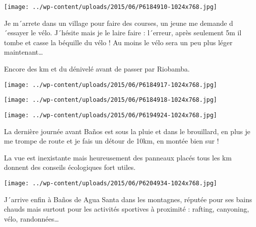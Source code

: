  

 

\begin{center} \texttt{[image: ../wp-content/uploads/2015/06/P6184910-1024x768.jpg]} \end{center}

 

 Je m´arrete dans un village pour faire des courses, un jeune me demande d´essayer le vélo. J´hésite mais je le laire faire : l´erreur, après seulement 5m il tombe et casse la béquille du vélo ! Au moins le vélo sera un peu plus léger maintenant…

 Encore des km et du dénivelé avant de passer par Riobamba. 

 

\begin{center} \texttt{[image: ../wp-content/uploads/2015/06/P6184917-1024x768.jpg]} \end{center}

 

 

\begin{center} \texttt{[image: ../wp-content/uploads/2015/06/P6184918-1024x768.jpg]} \end{center}

 

 

\begin{center} \texttt{[image: ../wp-content/uploads/2015/06/P6194924-1024x768.jpg]} \end{center}

 

 La dernière journée avant Baños est sous la pluie et dans le brouillard, en plus je me trompe de route et je fais un détour de 10km, en montée bien sur ! 

 La vue est inexistante mais heureusement des panneaux placés tous les km donnent des conseils écologiques fort utiles. 

 

\begin{center} \texttt{[image: ../wp-content/uploads/2015/06/P6204934-1024x768.jpg]} \end{center}

 

 J´arrive enfin à Baños de Agua Santa dans les montagnes, réputée pour ses bains chauds mais surtout pour les activités sportives à proximité : rafting, canyoning, vélo, randonnées… 

